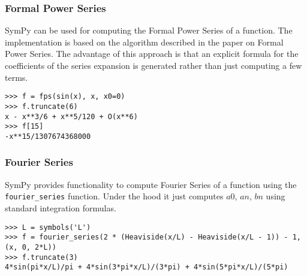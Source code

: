 \subsubsection{Formal Power Series}

SymPy can be used for computing the Formal Power Series of a function.
The implementation is based on the algorithm described in the paper on Formal Power Series\cite{Gruntz93formalpower}.
The advantage of this approach is that an explicit formula for the coefficients
of the series expansion is generated rather than just computing a few terms.

\begin{verbatim}
>>> f = fps(sin(x), x, x0=0)
>>> f.truncate(6)
x - x**3/6 + x**5/120 + O(x**6)
>>> f[15]
-x**15/1307674368000
\end{verbatim}

\subsubsection{Fourier Series}

SymPy provides functionality to compute Fourier Series of a function using
the \texttt{fourier\_series} function. Under the hood it just computes $a0$, $an$, $bn$ using
standard integration formulas.

\begin{verbatim}
>>> L = symbols('L')
>>> f = fourier_series(2 * (Heaviside(x/L) - Heaviside(x/L - 1)) - 1, (x, 0, 2*L))
>>> f.truncate(3)
4*sin(pi*x/L)/pi + 4*sin(3*pi*x/L)/(3*pi) + 4*sin(5*pi*x/L)/(5*pi)
\end{verbatim}
